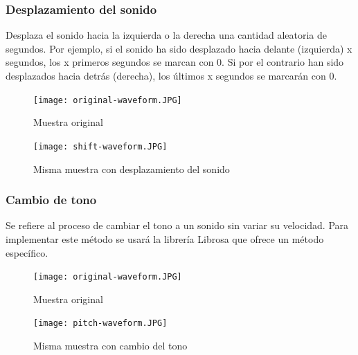\documentclass[11pt,a4paper,spanish]{book}
\begin{document}
				
		\subsubsection{Desplazamiento del sonido}
		Desplaza el sonido hacia la izquierda o la derecha una cantidad aleatoria de segundos. Por ejemplo, si el sonido ha sido desplazado hacia delante (izquierda) x segundos, los x primeros segundos se marcan con 0. Si por el contrario han sido desplazados hacia detrás (derecha), los últimos x segundos se marcarán con 0.
		
		\begin{figure}[!htb]
			\begin{minipage}{0.45\textwidth}
				\centering
				\texttt{[image: original-waveform.JPG]}
				\caption{Muestra original}
				\label{ref:audio_original_2}
			\end{minipage}\hfill 
			\begin{minipage}{0.45\textwidth}
				\centering
				\texttt{[image: shift-waveform.JPG]}\hfill
				\caption{Misma muestra con desplazamiento del sonido}
				\label{ref:audio_shiftting}
			\end{minipage}
		\end{figure}
		
		\subsubsection{Cambio de tono}
		Se refiere al proceso de cambiar el tono a un sonido sin variar su velocidad. Para implementar este método se usará la librería Librosa que ofrece un método específico.
		
		\begin{figure}[!htb]
			\begin{minipage}{0.45\textwidth}
				\centering
				\texttt{[image: original-waveform.JPG]}
				\caption{Muestra original}
				\label{ref:audio_original_3}
			\end{minipage}\hfill 
			\begin{minipage}{0.45\textwidth}
				\centering
				\texttt{[image: pitch-waveform.JPG]}\hfill
				\caption{Misma muestra con cambio del tono}
				\label{ref:audio_tunning}
			\end{minipage}
		\end{figure}
	
	
\end{document}
